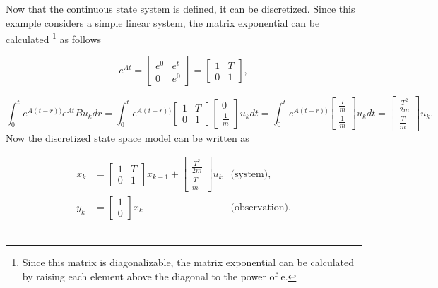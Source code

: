 \noindent Now that the continuous state system is defined, it can be discretized. Since this example considers a simple linear system, the matrix exponential can be calculated  \footnote{Since this matrix is diagonalizable, the matrix exponential can be calculated by raising each element above the diagonal to the power of e.} as follows 

$$e^{At} =
\begin{bmatrix}
e^0& e^t \\
0 & e^0
\end{bmatrix}=
\begin{bmatrix}
1& T\\
0 & 1
\end{bmatrix},
$$

$$\int_0^t e^{A(t-r))}  e^{At} B u_k dr=
\int_0^t e^{A(t-r))}  \begin{bmatrix}
1& T\\
0 & 1
\end{bmatrix} 
\begin{bmatrix}
0\\
\frac{1}{m}
\end{bmatrix} u_k dt =
\int_0^t e^{A(t-r))}   \begin{bmatrix}
\frac{T}{m}\\
\frac{1}{m} 
\end{bmatrix} u_k dt =
\begin{bmatrix}
\frac{T^2}{2m}\\
\frac{T}{m}
\end{bmatrix} u_k.
$$
Now the discretized state space model can be written as 


\begin{align*}
x_k &=
\begin{bmatrix}
1& T\\
0 & 1
\end{bmatrix}x_{k-1}+
\begin{bmatrix}
\frac{T^2}{2m}\\
\frac{T}{m}
\end{bmatrix} u_k &\text{(system)}, \\
y_k &=
\begin{bmatrix}
1 \\
0
\end{bmatrix} x_k &\text{(observation)}.
\end{align*} \\


